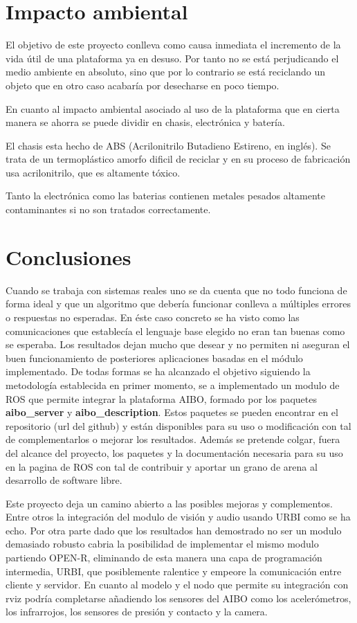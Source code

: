 \documentclass[12pt,a4paper,final,twoside]{article}
\begin{document}
\newpage

\section{Impacto ambiental}
El objetivo de este proyecto conlleva como causa inmediata el incremento de la vida útil de una plataforma ya en desuso. Por tanto no se está perjudicando el medio ambiente en absoluto, sino que por lo contrario se está reciclando un objeto que en otro caso acabaría por desecharse en poco tiempo.

En cuanto al impacto ambiental asociado al uso de la plataforma que en cierta manera se ahorra se puede dividir en chasis, electrónica y batería.

El chasis esta hecho de ABS (Acrilonitrilo Butadieno Estireno, en inglés). Se trata de un termoplástico amorfo dificil de reciclar y en su proceso de fabricación usa acrilonitrilo, que es altamente tóxico.

Tanto la electrónica como las baterias contienen metales pesados altamente contaminantes si no son tratados correctamente.
\newpage
\section*{Conclusiones}


Cuando se trabaja con sistemas reales uno se da cuenta que no todo funciona de forma ideal y que un algoritmo que debería funcionar conlleva a múltiples errores o respuestas no esperadas. En éste caso concreto se ha visto como las comunicaciones que establecía el lenguaje base elegido no eran tan buenas como se esperaba. Los resultados dejan mucho que desear y no permiten ni aseguran el buen funcionamiento de posteriores aplicaciones basadas en el módulo implementado. De todas formas se ha alcanzado el objetivo siguiendo la metodología establecida en primer momento, se a implementado un modulo de ROS que permite integrar la plataforma AIBO, formado por los paquetes \textbf{aibo{\_}server} y \textbf{aibo{\_}description}. Estos paquetes se pueden encontrar en el repositorio (url del github) y están disponibles para su uso o modificación con tal de complementarlos o mejorar los resultados. Además se pretende colgar, fuera del alcance del proyecto, los paquetes y la documentación necesaria para su uso en la pagina de ROS con tal de contribuir y aportar un grano de arena al desarrollo de software libre.

Este proyecto deja un camino abierto a las posibles mejoras y complementos. Entre otros la integración del modulo de visión y audio usando URBI como se ha echo. Por otra parte dado que los resultados han demostrado no ser un modulo demasiado robusto cabria la posibilidad de implementar el mismo modulo partiendo OPEN-R, eliminando de esta manera una capa de programación intermedia, URBI, que posiblemente ralentice y empeore la comunicación entre cliente y servidor. En cuanto al modelo y el nodo que permite su integración con rviz podría completarse añadiendo los sensores del AIBO como los acelerómetros, los infrarrojos, los sensores de presión y contacto y la camera.
\end{document}
